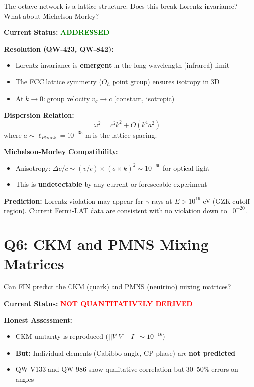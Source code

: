 \documentclass[11pt,a4paper]{book}
\theoremstyle{remark}
\begin{document}
\begin{question}[Relativity]
The octave network is a lattice structure. Does this break Lorentz invariance? What about Michelson-Morley?
\end{question}

\textbf{Current Status:} \textcolor{green}{\textbf{ADDRESSED}}

\textbf{Resolution (QW-423, QW-842):}
\begin{itemize}
    \item Lorentz invariance is \textbf{emergent} in the long-wavelength (infrared) limit
    \item The FCC lattice symmetry ($O_h$ point group) ensures isotropy in 3D
    \item At $k \to 0$: group velocity $v_g \to c$ (constant, isotropic)
\end{itemize}

\textbf{Dispersion Relation:}
\begin{equation}
\omega^2 = c^2 k^2 + O(k^4 a^2)
\end{equation}
where $a \sim \ell_{Planck} = 10^{-35}$ m is the lattice spacing.

\textbf{Michelson-Morley Compatibility:}
\begin{itemize}
    \item Anisotropy: $\Delta c / c \sim (v/c) \times (a \times k)^2 \sim 10^{-60}$ for optical light
    \item This is \textbf{undetectable} by any current or foreseeable experiment
\end{itemize}

\textbf{Prediction:}
Lorentz violation may appear for $\gamma$-rays at $E > 10^{19}$ eV (GZK cutoff region). Current Fermi-LAT data are consistent with no violation down to $10^{-20}$.

\hrulefill

\section{Q6: CKM and PMNS Mixing Matrices}

\begin{question}
Can FIN predict the CKM (quark) and PMNS (neutrino) mixing matrices?
\end{question}

\textbf{Current Status:} \textcolor{red}{\textbf{NOT QUANTITATIVELY DERIVED}}

\textbf{Honest Assessment:}
\begin{itemize}
    \item CKM unitarity is reproduced ($||V^\dagger V - I|| \sim 10^{-16}$)
    \item \textbf{But:} Individual elements (Cabibbo angle, CP phase) are \textbf{not predicted}
    \item QW-V133 and QW-986 show qualitative correlation but 30--50\% errors on angles
\end{itemize}
\end{document}
